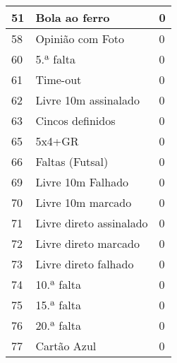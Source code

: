 \begin{longtable}{| p{} | p{} | p{} |}
    51 & Bola ao ferro & 0 \\ \hline
    58 & Opinião com Foto & 0 \\ \hline
    60 & 5.ª falta & 0 \\ \hline
    61 & Time-out & 0 \\ \hline
    62 & Livre 10m assinalado & 0 \\ \hline
    63 & Cincos definidos & 0 \\ \hline
    65 & 5x4+GR & 0 \\ \hline
    66 & Faltas (Futsal) & 0 \\ \hline
    69 & Livre 10m Falhado & 0 \\ \hline
    70 & Livre 10m marcado & 0 \\ \hline
    71 & Livre direto assinalado & 0 \\ \hline 
    72 & Livre direto marcado & 0 \\ \hline
    73 & Livre direto falhado & 0 \\ \hline
    74 & 10.ª falta & 0 \\ \hline
    75 & 15.ª falta & 0 \\ \hline
    76 & 20.ª falta & 0 \\ \hline
    77 & Cartão Azul & 0 \\ \hline
\end{longtable}


    

